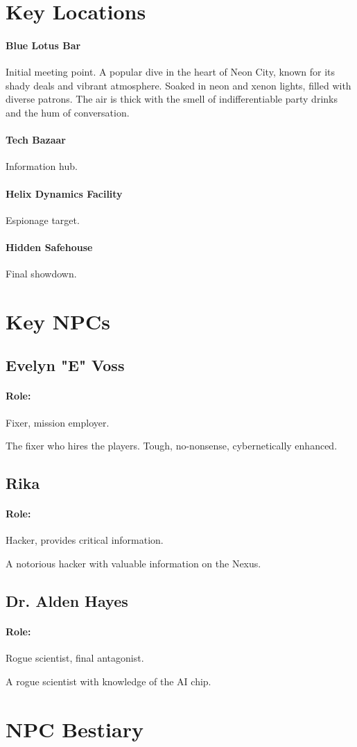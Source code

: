 \section{Key Locations}
\paragraph{Blue Lotus Bar}
\label{location:bar}
Initial meeting point.
A popular dive in the heart of Neon City,
known for its shady deals and vibrant atmosphere.
Soaked in neon and xenon lights, filled with diverse patrons.
The air is thick with the smell of indifferentiable party drinks and the hum of conversation.
\paragraph{Tech Bazaar}
Information hub.
\paragraph{Helix Dynamics Facility}
Espionage target.
\paragraph{Hidden Safehouse}
Final showdown.
\section{Key NPCs}
\subsection{Evelyn "E" Voss}
\label{char:E}
\paragraph{Role:}
Fixer, mission employer.
\par
The fixer who hires the players. Tough, no-nonsense, cybernetically enhanced.
\subsection{Rika}
\paragraph{Role:}
Hacker, provides critical information.
\par
A notorious hacker with valuable information on the Nexus.
\subsection{Dr. Alden Hayes}
\paragraph{Role:}
Rogue scientist, final antagonist.
\par
A rogue scientist with knowledge of the AI chip.
\section{NPC Bestiary}
